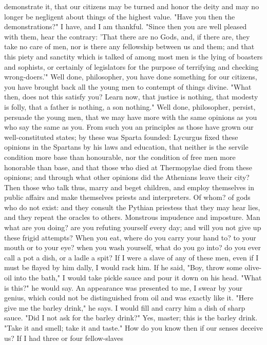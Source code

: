 \documentclass[a4paper]{article}
\begin{document}
demonstrate it, that our citizens may be turned and honor the deity and may no
longer be negligent about things of the highest value. "Have you then the
demonstrations?" I have, and I am thankful. "Since then you are well pleased
with them, hear the contrary: 'That there are no Gods, and, if there are, they
take no care of men, nor is there any fellowship between us and them; and that
this piety and sanctity which is talked of among most men is the lying of
boasters and sophists, or certainly of legislators for the purpose of
terrifying and checking wrong-doers.'" Well done, philosopher, you have done
something for our citizens, you have brought back all the young men to contempt
of things divine. "What then, does not this satisfy you? Learn now, that
justice is nothing, that modesty is folly, that a father is nothing, a son
nothing." Well done, philosopher, persist, persuade the young men, that we may
have more with the same opinions as you who say the same as you. From such you
an principles as those have grown our well-constituted states; by these was
Sparta founded: Lycurgus fixed these opinions in the Spartans by his laws and
education, that neither is the servile condition more base than honourable, nor
the condition of free men more honorable than base, and that those who died at
Thermopylae died from these opinions; and through what other opinions did the
Athenians leave their city? Then those who talk thus, marry and beget children,
and employ themselves in public affairs and make themselves priests and
interpreters. Of whom? of gods who do not exist: and they consult the Pythian
priestess that they may hear lies, and they repeat the oracles to others.
Monstrous impudence and imposture.
    Man what are you doing? are you refuting yourself every day; and will you
not give up these frigid attempts? When you eat, where do you carry your hand
to? to your mouth or to your eye? when you wash yourself, what do you go into?
do you ever call a pot a dish, or a ladle a spit? If I were a slave of any of
these men, even if I must be flayed by him dally, I would rack him. If he said,
"Boy, throw some olive-oil into the bath," I would take pickle sauce and pour
it down on his head. "What is this?" he would say. An appearance was presented
to me, I swear by your genius, which could not be distinguished from oil and
was exactly like it. "Here give me the barley drink," he says. I would fill and
carry him a dish of sharp sauce. "Did I not ask for the barley drink?" Yes,
master; this is the barley drink. "Take it and smell; take it and taste." How
do you know then if our senses deceive us? If I had three or four fellow-slaves
\end{document}
